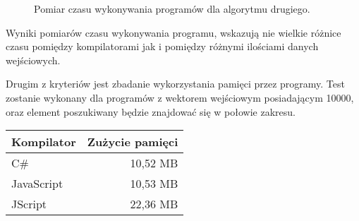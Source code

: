 \begin{figure}[h!]
  \centering
  \caption{Pomiar czasu wykonywania programów dla algorytmu drugiego.}
\end{figure}

\par Wyniki pomiarów czasu wykonywania programu, wskazują nie wielkie różnice czasu pomiędzy kompilatorami jak i pomiędzy różnymi ilościami danych wejściowych.

\par Drugim z kryteriów jest zbadanie wykorzystania pamięci przez programy. Test zostanie wykonany dla programów z wektorem wejściowym posiadającym 10000, oraz element poszukiwany będzie znajdować się w połowie zakresu. 

\begin{table}[h!]
  \centering
  \begin{tabular}{|l|r|}
  \hline
  Kompilator & Zużycie pamięci \\ \hline
  C\# & 10,52 MB \\ \hline
  JavaScript & 10,53 MB \\ \hline
  JScript & 22,36 MB \\ \hline
  \end{tabular}
\end{table}



